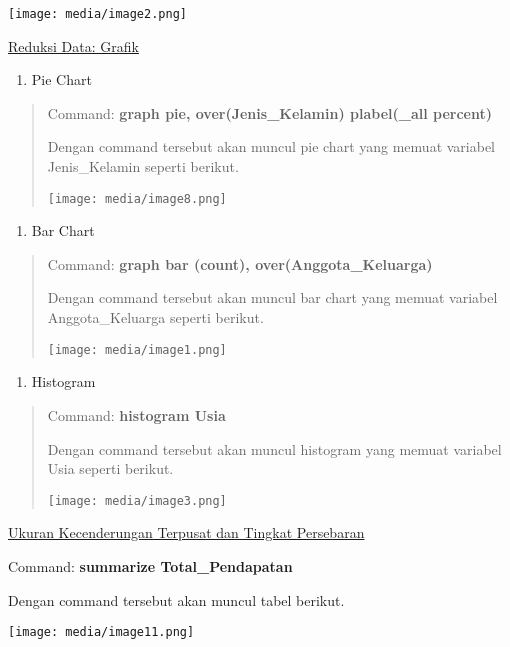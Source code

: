 \documentclass[
]{article}
\begin{document}
\texttt{[image: media/image2.png]}

\uline{Reduksi Data: Grafik}

\begin{enumerate}
\def\labelenumi{\arabic{enumi}.}
\item
  Pie Chart
\end{enumerate}

\begin{quote}
Command: \textbf{graph pie, over(Jenis\_Kelamin) plabel(\_all percent)}

Dengan command tersebut akan muncul pie chart yang memuat variabel
Jenis\_Kelamin seperti berikut.

\texttt{[image: media/image8.png]}
\end{quote}

\begin{enumerate}
\def\labelenumi{\arabic{enumi}.}
\setcounter{enumi}{1}
\item
  Bar Chart
\end{enumerate}

\begin{quote}
Command: \textbf{graph bar (count), over(Anggota\_Keluarga)}

Dengan command tersebut akan muncul bar chart yang memuat variabel
Anggota\_Keluarga seperti berikut.

\texttt{[image: media/image1.png]}
\end{quote}

\begin{enumerate}
\def\labelenumi{\arabic{enumi}.}
\setcounter{enumi}{2}
\item
  Histogram
\end{enumerate}

\begin{quote}
Command: \textbf{histogram Usia}

Dengan command tersebut akan muncul histogram yang memuat variabel Usia
seperti berikut.

\texttt{[image: media/image3.png]}
\end{quote}

\uline{Ukuran Kecenderungan Terpusat dan Tingkat Persebaran}

Command: \textbf{summarize Total\_Pendapatan}

Dengan command tersebut akan muncul tabel berikut.

\texttt{[image: media/image11.png]}
\end{document}
